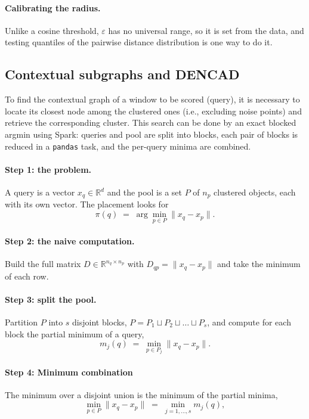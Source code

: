 \documentclass{article}
\begin{document}
\paragraph{Calibrating the radius.} Unlike a cosine threshold, $\varepsilon$ has no universal range,
so it is set from the data, and testing quantiles of the pairwise distance distribution is one way to do it.

\subsection{Contextual subgraphs and DENCAD}

To find the contextual graph of a window to be scored (query), it is necessary to locate its closest node among the clustered ones (i.e., excluding noise points) and retrieve the corresponding cluster.
This search can be done by an exact blocked argmin using Spark: queries and pool are split into blocks, each pair of blocks is
reduced in a \texttt{pandas} task, and the per-query minima are combined.

\paragraph{Step 1: the problem.} A query is a vector $x_q \in \mathbb{R}^{d}$ and the pool
is a set $P$ of $n_p$ clustered objects, each with its own vector. The placement looks for
\begin{equation}
  \pi(q) \;=\; \arg\min_{p \in P} \lVert x_q - x_p \rVert .
\end{equation}

\paragraph{Step 2: the naive computation.} Build the full matrix $D \in
\mathbb{R}^{n_q \times n_p}$ with $D_{qp} = \lVert x_q - x_p \rVert$ and take the minimum
of each row.

\paragraph{Step 3: split the pool.} Partition $P$ into $s$ disjoint blocks,
$P = P_1 \sqcup P_2 \sqcup \dots \sqcup P_s$, and compute for each block the partial
minimum of a query,
\begin{equation}
  m_j(q) \;=\; \min_{p \in P_j} \lVert x_q - x_p \rVert .
\end{equation}

\paragraph{Step 4: Minimum combination} The minimum over a disjoint union is
the minimum of the partial minima,
\begin{equation}
  \min_{p \in P} \lVert x_q - x_p \rVert \;=\; \min_{j = 1, \dots, s} m_j(q) ,
  \label{eq:minsplit}
\end{equation}
\end{document}
